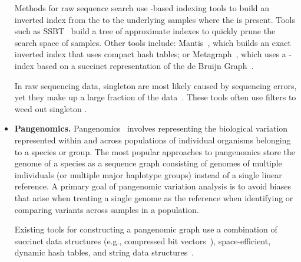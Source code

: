 \begin{itemize}
 

Methods for raw sequence search use \kmer-based indexing tools to build an inverted index from the \kmers to the underlying samples where the \kmer is present. Tools such as SSBT~\cite{solomon2016fast} build a tree of approximate \kmer indexes to quickly prune the search space of samples. Other tools include:  Mantis~\cite{PandeyAlBe18}, which builds an exact inverted index that uses compact hash tables; or Metagraph~\cite{Karasikov2020}, which uses a \kmer-index based on a succinct representation of the de Bruijn Graph~\cite{bowe2012succinct}.

 

In raw sequencing data, singleton \kmers are most likely caused by sequencing errors, yet they make up a large fraction of the data~\cite{solomon2016fast,MarccaisKi11}. These tools often use filters to weed out singleton \kmers.



 

\item \textbf{Pangenomics.}
Pangenomics~\cite{garrison2018variation} involves representing the biological variation represented within and across populations of individual organisms belonging to a species or group.  The most popular approaches to pangenomics store the genome of a species as a sequence graph consisting of genomes of multiple individuals (or multiple major haplotype groups) instead of a single linear reference. A primary goal of pangenomic variation analysis is to avoid biases that arise when treating a single genome as the reference when identifying or comparing variants across samples in a population.

 

Existing tools for constructing a pangenomic graph use a combination of succinct data structures (e.g., compressed bit vectors~\cite{garrison2018variation}), space-efficient, dynamic hash tables, and string data structures~\cite{pandey2021variantstore}.


\end{itemize}

